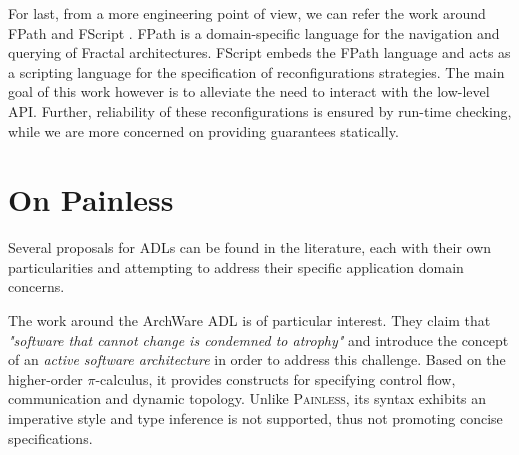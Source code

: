 	




	For last, from a more engineering point of view, we can refer the work around FPath and FScript \cite{journals/adt/DavidLLC09}.
	FPath is a domain-specific language for the navigation and querying of Fractal architectures. FScript embeds the FPath
	language and acts as a scripting language for the specification of reconfigurations strategies. The main goal of this
	work however is to alleviate the need to interact with the low-level API. Further, reliability of these reconfigurations
	is ensured by run-time checking, while we are more concerned on providing guarantees statically.
	


\section{On Painless}
\label{sec:relpainless}

	Several proposals for \ac{ADL}s can be found in the literature, each with their own 
	particularities and attempting to 
	address their specific application domain concerns. 
	
	The work around the ArchWare \ac{ADL} \cite{DBLP:journals/corr/abs-1006-4829} 
	is of particular interest. They claim that 
	\textit{"software that cannot change is condemned to atrophy"}	
	and introduce the concept of an \textit{active software architecture} in order
	to address this challenge. Based on the higher-order $\pi$-calculus, it provides
	constructs for specifying control flow, communication and dynamic topology.
	Unlike \textsc{Painless}, its syntax exhibits an imperative style 
	and type inference is not supported, thus not promoting concise specifications. 
	
